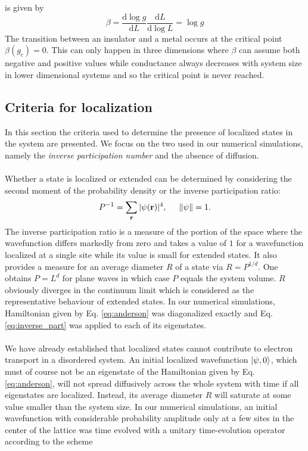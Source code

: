 \documentclass[10pt,a4paper]{article}
\begin{document}
is given by
$$
\beta=\frac{\mathrm{d}\log g}{\mathrm{d}L}\frac{\mathrm{d}L}{\mathrm{d}\log L}=\log g
$$
The transition between an insulator and a metal occurs at the critical point $\beta(g_c)=0$.  This can only happen in three dimensions where $\beta$ can assume both negative  
and positive values while conductance always decreases with system size in lower dimensional systems and so the critical point is never reached.
 \subsection{Criteria for localization}
In this section the criteria used to determine the presence of localized states in the system are presented. We focus on the two used in our numerical simulations, namely the \emph{inverse participation number} and the absence of diffusion. \\\\
\noindent Whether a state is localized or extended can be determined by considering the second moment of the probability density or the inverse participation ratio:
\begin{equation}\label{eq:inverse_part}
P^{-1}=\sum\limits_\mathbf{r} |\psi(\textbf{r})|^4, \hspace{5mm} \left\Vert \psi \right\Vert=1.
\end{equation}
The inverse participation ratio is a measure of the portion of the space where the wavefunction differs markedly from zero and takes a value of $1$ for a wavefunction localized at a single site while its value is small for extended states. It also provides a measure for an average diameter $R$ of a state via $R=P^{1/d}$. One obtains $P=L^d$ for plane waves in which case $P$ equals the system volume. $R$ obviously diverges in the continuum limit which is considered as the representative behaviour of extended states. In our numerical simulations, Hamiltonian given by Eq. \eqref{eq:anderson} was diagonalized exactly and Eq. \eqref{eq:inverse_part} was applied to each of its eigenstates. \\\\
We have already established that localized states cannot contribute to electron transport in a disordered system. An initial localized wavefunction $\vert\psi, 0\rangle$, which must of course not be an eigenstate of the Hamiltonian given by Eq. \eqref{eq:anderson}, will not spread diffusively across the whole system with time if all eigenstates are localized. Instead, its average diameter $R$ will saturate at some value smaller than the system size. In our numerical simulations, an initial wavefunction with considerable probability amplitude only at a few sites in the center of the lattice was time evolved with a unitary time-evolution operator according to the scheme
\end{document}
